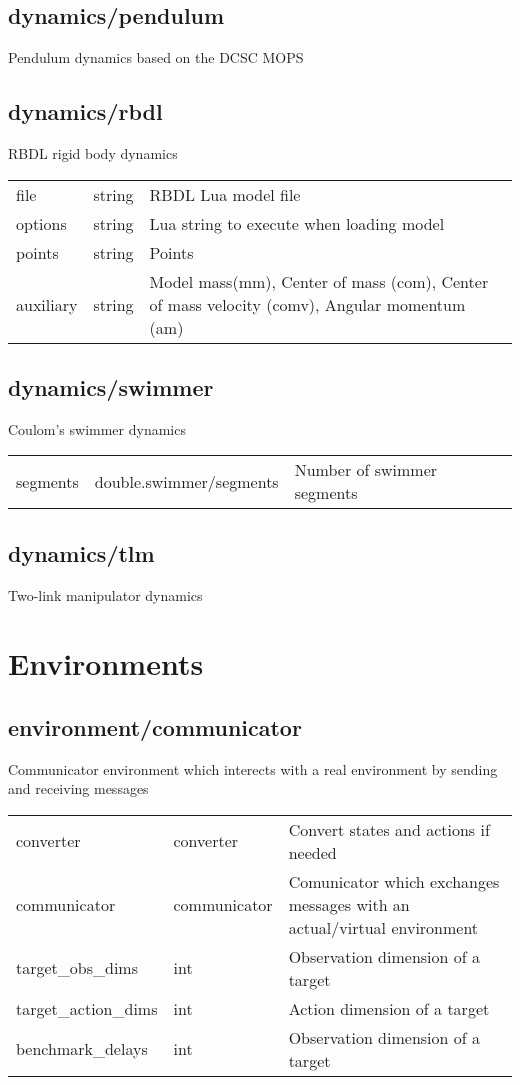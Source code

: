 \subsection{dynamics/pendulum}
\noindent Pendulum dynamics based on the DCSC MOPS\\

\subsection{dynamics/rbdl}
\noindent RBDL rigid body dynamics\\

\noindent\begin{tabular}{@{}lll@{}}
file&string&RBDL Lua model file\\
options&string&Lua string to execute when loading model\\
points&string&Points\\
auxiliary&string&Model mass(mm), Center of mass (com), Center of mass velocity (comv), Angular momentum (am)\\
\end{tabular}
\subsection{dynamics/swimmer}
\noindent Coulom's swimmer dynamics\\

\noindent\begin{tabular}{@{}lll@{}}
segments&double.swimmer/segments&Number of swimmer segments\\
\end{tabular}
\subsection{dynamics/tlm}
\noindent Two-link manipulator dynamics\\

\section{Environments}
\subsection{environment/communicator}
\noindent Communicator environment which interects with a real environment by sending and receiving messages\\

\noindent\begin{tabular}{@{}lll@{}}
converter&converter&Convert states and actions if needed\\
communicator&communicator&Comunicator which exchanges messages with an actual/virtual environment\\
target\_obs\_dims&int&Observation dimension of a target\\
target\_action\_dims&int&Action dimension of a target\\
benchmark\_delays&int&Observation dimension of a target\\
\end{tabular}
